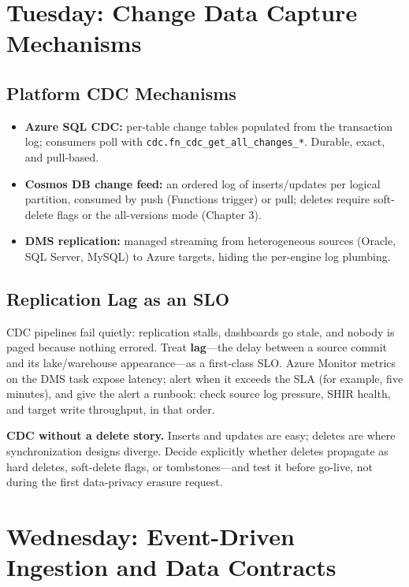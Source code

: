 \section{Tuesday: Change Data Capture Mechanisms}

\subsection{Platform CDC Mechanisms}
\begin{itemize}
    \item \textbf{Azure SQL CDC:} per-table change tables populated from the transaction log; consumers poll with \texttt{cdc.fn\_cdc\_get\_all\_changes\_*}. Durable, exact, and pull-based.
    \item \textbf{Cosmos DB change feed:} an ordered log of inserts/updates per logical partition, consumed by push (Functions trigger) or pull; deletes require soft-delete flags or the all-versions mode (Chapter 3).
    \item \textbf{DMS replication:} managed streaming from heterogeneous sources (Oracle, SQL Server, MySQL) to Azure targets, hiding the per-engine log plumbing.
\end{itemize}

\subsection{Replication Lag as an SLO}
CDC pipelines fail quietly: replication stalls, dashboards go stale, and nobody is paged because nothing errored. Treat \textbf{lag}---the delay between a source commit and its lake/warehouse appearance---as a first-class SLO. Azure Monitor metrics on the DMS task expose latency; alert when it exceeds the SLA (for example, five minutes), and give the alert a runbook: check source log pressure, SHIR health, and target write throughput, in that order.

\begin{pitfall}
\textbf{CDC without a delete story.} Inserts and updates are easy; deletes are where synchronization designs diverge. Decide explicitly whether deletes propagate as hard deletes, soft-delete flags, or tombstones---and test it before go-live, not during the first data-privacy erasure request.
\end{pitfall}

\section{Wednesday: Event-Driven Ingestion and Data Contracts}

